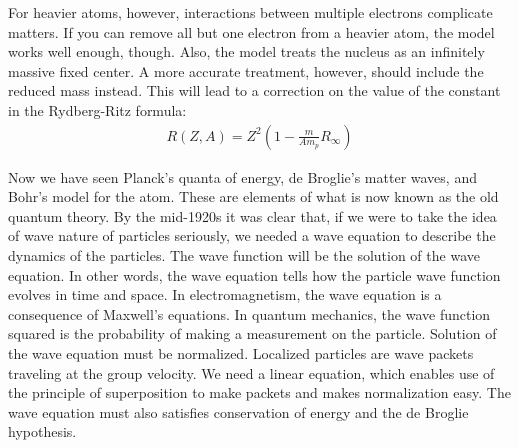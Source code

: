 \documentclass[11pt]{article}
\theoremstyle{break}
\theoremstyle{break}
\begin{document}
For heavier atoms, however, interactions between multiple electrons complicate matters. If you can remove all but one electron from a heavier atom, the model works well enough, though. Also, the model treats the nucleus as an infinitely massive fixed center. A more accurate treatment, however, should include the reduced mass instead. This will lead to a correction on the value of the constant in the Rydberg-Ritz formula:
\begin{align*}
R(Z,A) = Z^2 \left( 1-\frac{m}{Am_p}R_{\infty}\right)
\end{align*}

\hfill\break\hfill\break
Now we have seen Planck's quanta of energy, de Broglie's matter waves, and Bohr's model for the atom. These are elements of what is now known as the old quantum theory. By the mid-1920s it was clear that, if we were to take the idea of wave nature of particles seriously, we needed a wave equation to describe the dynamics of the particles. The wave function will be the solution of the wave equation. In other words, the wave equation tells how the particle wave function evolves in time and space. In electromagnetism, the wave equation is a consequence of Maxwell's equations. In quantum mechanics, the wave function squared is the probability of making a measurement on the particle. Solution of the wave equation must be normalized. Localized particles are wave packets traveling at the group velocity. We need a linear equation, which enables use of the principle of superposition to make packets 
and makes normalization easy. The wave equation must also satisfies conservation of energy and the de Broglie hypothesis.\\

\newpage
\end{document}
